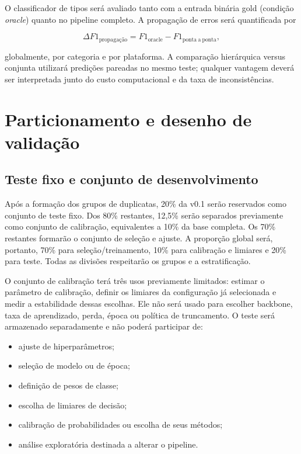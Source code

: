 O classificador de tipos será avaliado tanto com a entrada binária gold
(condição \textit{oracle}) quanto no pipeline completo. A propagação de erros
será quantificada por

\begin{equation}
    \Delta F1_{\mathrm{propagação}} =
    F1_{\mathrm{oracle}}-F1_{\mathrm{ponta\ a\ ponta}},
\end{equation}

globalmente, por categoria e por plataforma. A comparação hierárquica versus
conjunta utilizará predições pareadas no mesmo teste; qualquer vantagem deverá
ser interpretada junto do custo computacional e da taxa de inconsistências.

\section{Particionamento e desenho de validação}
\label{sec:particionamento}

\subsection{Teste fixo e conjunto de desenvolvimento}

Após a formação dos grupos de duplicatas, 20\% da v0.1 serão reservados como
conjunto de teste fixo. Dos 80\% restantes, 12,5\% serão separados previamente
como conjunto de calibração, equivalentes a 10\% da base completa. Os 70\%
restantes formarão o conjunto de seleção e ajuste. A proporção global será,
portanto, 70\% para seleção/treinamento, 10\% para calibração e limiares e 20\%
para teste. Todas as divisões respeitarão os grupos e a estratificação.

O conjunto de calibração terá três usos previamente limitados: estimar o
parâmetro de calibração, definir os limiares da configuração já selecionada e
medir a estabilidade dessas escolhas. Ele não será usado para escolher backbone,
taxa de aprendizado, perda, época ou política de truncamento. O teste será
armazenado separadamente e não poderá participar de:

\begin{itemize}
    \item ajuste de hiperparâmetros;
    \item seleção de modelo ou de época;
    \item definição de pesos de classe;
    \item escolha de limiares de decisão;
    \item calibração de probabilidades ou escolha de seus métodos;
    \item análise exploratória destinada a alterar o pipeline.
\end{itemize}

